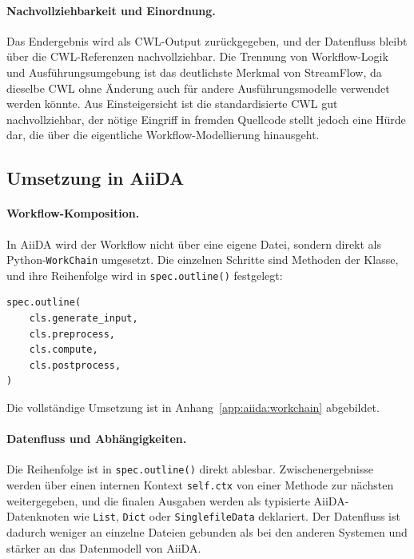 \paragraph{Nachvollziehbarkeit und Einordnung.}
Das Endergebnis wird als CWL-Output zurückgegeben, und der Datenfluss bleibt über die CWL-Referenzen
nachvollziehbar. Die Trennung von Workflow-Logik und Ausführungsumgebung ist das deutlichste
Merkmal von StreamFlow, da dieselbe CWL ohne Änderung auch für andere Ausführungsmodelle verwendet werden könnte. Aus Einsteigersicht ist die standardisierte CWL gut
nachvollziehbar, der nötige Eingriff in fremden Quellcode stellt jedoch eine Hürde dar,
die über die eigentliche Workflow-Modellierung hinausgeht.

\subsection{Umsetzung in AiiDA}
\label{sec:practical:pipeline:aiida}

\paragraph{Workflow-Komposition.}
In AiiDA wird der Workflow nicht über eine eigene Datei, sondern direkt als
Python-\texttt{WorkChain} umgesetzt. Die einzelnen Schritte sind Methoden der Klasse, und ihre
Reihenfolge wird in \texttt{spec.outline()} festgelegt:

\begin{lstlisting}[language=Python,caption={Festlegung der Schrittreihenfolge (AiiDA, Pipeline)},label={lst:pipe:ai:outline}]
spec.outline(
    cls.generate_input,
    cls.preprocess,
    cls.compute,
    cls.postprocess,
)
\end{lstlisting}

Die vollständige Umsetzung ist in Anhang~\ref{app:aiida:workchain} abgebildet.

\paragraph{Datenfluss und Abhängigkeiten.}
Die Reihenfolge ist in \texttt{spec.outline()} direkt ablesbar. Zwischenergebnisse werden über
einen internen Kontext \texttt{self.ctx} von einer Methode zur nächsten weitergegeben, und die
finalen Ausgaben werden als typisierte AiiDA-Datenknoten wie \texttt{List}, \texttt{Dict} oder
\texttt{SinglefileData} deklariert. Der Datenfluss ist dadurch weniger an einzelne Dateien gebunden
als bei den anderen Systemen und stärker an das Datenmodell von AiiDA.

